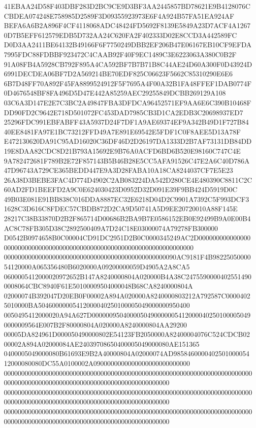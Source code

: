 \documentclass[UTF8,fontset=fandol,zihao=-4,a4paper]{ctexart}
\begin{document}
{{41EBAA24D58F403DBF283D2BC9CE9D3BF3AA2445857BD78621E9B4128076CCBDEA074248E758985D2589F3D09355923973E6F4A924B57FA51EA924AF
BEFA6A6B2A896F4CF4118068ADC48424FD5692F8139E5849A23D7ACF4A12670D7B5EFF612579EDB5D732AA24C620FA2F402333D02E8CCD3A442589FC
D0D3AA2411BE64132B49166F6F7750249DBB2EF206B47E06167EB10CF9EFDA7995FDC88FDBBF923472C4CAAB92F40F9EC1489C3E6223063A380C0B2F
91A08FB4A5928CB792F895A4CA592BF7B7B71B8C44AE24D60A300F0D43924D6991DECDEA06BF7D2A569214BE70EDF825C06623F5662C85310290E6E6
6B7D48FF70A892F45FA8899524912F5F7695A4F00A32B1FA48FFEF1DAB0774F0D4676548BF8FA496D5D47E442A85259AEC29255849DCBB269129A108
03C6A3D147E2E7C3BC2A49847FBA3DFDCA96452571EF9AA6E6C390B10468FDD90FD2C9642E718D501072FC453DAD7985CB3D1CA2EDB3C20698937ED7
25296FDC991EBFABFF43A5937D24F7DF1A9AE69374EF9A342B49D1F727B8440EE8481FA97E1BC73212FFD49A7E891E69542E5FDF1C0F8AEE5D13A78F
E472130620DA91C95AD16020C36DF46D2D26197DA1333D2B7AF73131DB84DD19E8DAA82CDC8D21B793A15692E9B76A0ACFD6BD6B520E98160C747C4E
9A782472681F789B2E72F857143B5B46B28E5CC5AFA91526C47E2A6C40D786A47D96743A729CE365BEDD447E9A3D28FABA10A18CA8244037CF7E5E23
26A38D3BEBE3FAC4D774D4902C2AB083224DA542D280CE4E480390C8811C2C60AD2FD1BEEFD2A9C0E624030423D0952D32D091E39F9BB424D5919D0C
49B03E081E91BB838C016DDA8887EC32E6218D04D2C9901A7392C5F993DCF31628C3D616C8FDEC57CBDB872D2CA9D50741A5D9EE20720010A88F145E
28217C38B33870D2B2F865714D00686B2BA9B7E0586152EB0E92499B9A0E00B4AC8C78FB305D38C2892500409A7D24C18E03000074A79278FB300000
D0542B0974658B0C00004CD91DC2951D2B0C0000345249AC2D0000000000000000000000000000000000000000000000000000000000000000000000
00000000000000000000000000000000000000000000000090AC9181F4B9822505000054120000A065356480B6020000A09200000059D4905A2A8CA5
0600005412000020972652B147A8240000804A020000B4A38C24755900004025514900008064CBC8940F61E50100009504000048B68CA8240000804A
02000074B392047D20EB0F00002A894A020000A8240000803212A792587C00004025010000BA50460000005412000040250100005049000000950400
0050495412000020A94A627D00000095040000504900000054120000402501000050490000009564E007B2F80000804A020000A8240000804AA29200
00005DA824961D000050490000802E54123FB2050000A82400004076C524CDCB0200002A894A02000084AE24039708650400005049000080AE151365
0400005049000080B61693E9B2A40000804A02000074AD985846000040250100005412000080080DC55A0100002A0900000000000000000000000000
000000000000000000000000000000000000000000000000000000000000000000000000000000000000000000000000000000000000000000000000
000000000000000000000000000000000000000000000000000000000000000000000000000000000000000000000000000000000000000000000000
000000000000000000000000000000000000000000000000000000000000000000000000000000000000000000000000000000000000000000000000
}}
\end{document}
